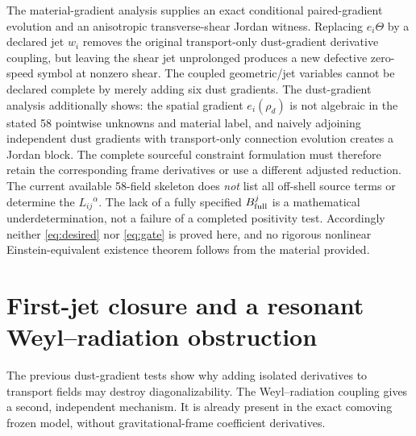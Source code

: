 \documentclass[11pt,a4paper]{article}
\begin{document}
The material-gradient analysis supplies an exact conditional paired-gradient evolution and an anisotropic transverse-shear Jordan witness. Replacing $e_i\Theta$ by a declared jet $w_i$ removes the original transport-only dust-gradient derivative coupling, but leaving the shear jet unprolonged produces a new defective zero-speed symbol at nonzero shear. The coupled geometric/jet variables cannot be declared complete by merely adding six dust gradients. The dust-gradient analysis additionally shows: the spatial gradient $e_i(\rho_d)$ is not algebraic in the stated 58 pointwise unknowns and material label, and naively adjoining independent dust gradients with transport-only connection evolution creates a Jordan block. The complete sourceful constraint formulation must therefore retain the corresponding frame derivatives or use a different adjusted reduction. The current available 58-field skeleton does \emph{not} list all off-shell source terms or determine the $L_{ij}{}^\alpha$. The lack of a fully specified $B^j_{\rm full}$ is a mathematical underdetermination, not a failure of a completed positivity test. Accordingly neither \eqref{eq:desired} nor \eqref{eq:gate} is proved here, and no rigorous nonlinear Einstein-equivalent existence theorem follows from the material provided.


\section{First-jet closure and a resonant Weyl--radiation obstruction}\label{sec:resonant}
The previous dust-gradient tests show why adding isolated derivatives to transport fields may destroy diagonalizability. The Weyl--radiation coupling gives a second, independent mechanism. It is already present in the exact comoving frozen model, without gravitational-frame coefficient derivatives.
\end{document}
